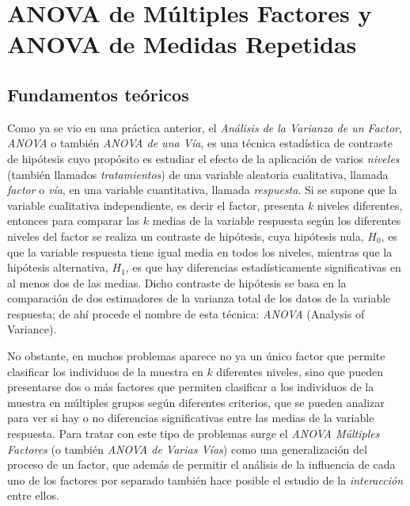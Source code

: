 
\chapter[ANOVA de múltiples factores y medidas repetidas]{ANOVA de Múltiples Factores y ANOVA de Medidas Repetidas}

\medskip
\section{Fundamentos teóricos}
Como ya se vio en una práctica anterior, el \emph{Análisis de la Varianza de un Factor}, \emph{ANOVA} o también
\emph{ANOVA de una Vía}, es una técnica estadística de contraste de hipótesis cuyo propósito es estudiar el efecto de la
aplicación de varios \emph{niveles} (también llamados \emph{tratamientos}) de una variable aleatoria cualitativa,
llamada \emph{factor} o \emph{vía}, en una variable cuantitativa, llamada \emph{respuesta}.
Si se supone que la variable cualitativa independiente, es decir el factor, presenta $k$ niveles diferentes, entonces
para comparar las $k$ medias de la variable respuesta según los diferentes niveles del factor se realiza un contraste de
hipótesis, cuya hipótesis nula, $H_0$, es que la variable respuesta tiene igual media en todos los niveles, mientras que
la hipótesis alternativa, $H_1$, es que hay diferencias estadísticamente significativas en al menos dos de las medias.
 Dicho contraste de
hipótesis se basa en la comparación de dos estimadores de la varianza total de los datos de la variable respuesta; de
ahí procede el nombre de esta técnica: \emph{ANOVA} (Analysis of Variance).

No obstante, en muchos problemas aparece no ya un único factor que permite clasificar los individuos de la muestra en
$k$ diferentes niveles, sino que pueden presentarse dos o más factores que permiten clasificar a los individuos de la
muestra en múltiples grupos según diferentes criterios, que se pueden analizar para ver si hay o no diferencias
significativas entre las medias de la variable respuesta.
Para tratar con este tipo de problemas surge el \emph{ANOVA Múltiples Factores} (o también \emph{ANOVA de Varias Vías})
como una generalización del proceso de un factor, que además de permitir el análisis de la influencia de cada uno de los
factores por separado también hace posible el estudio de la \emph{interacción} entre ellos.

